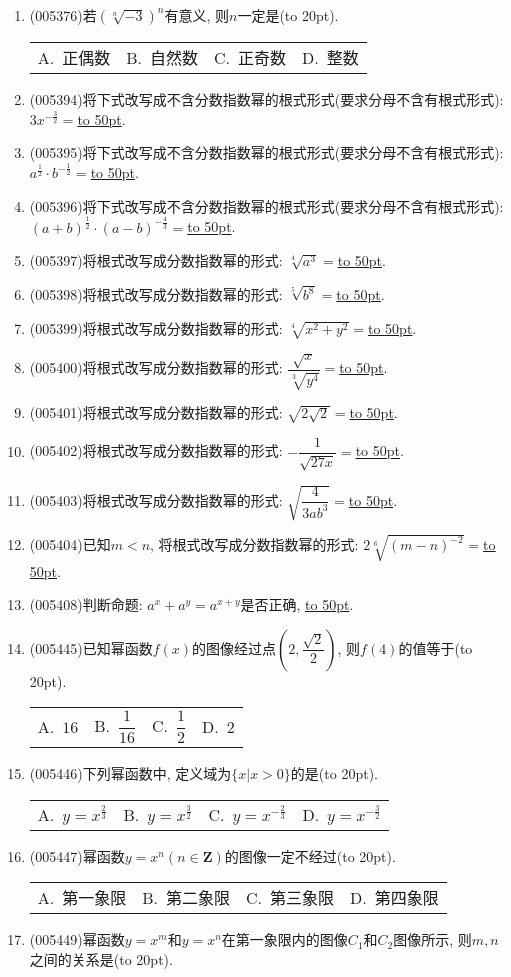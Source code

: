 \documentclass[10pt,a4paper]{article}
\newcommand{\blank}[1]{\underline{\hbox to #1pt{}}}
\newcommand{\bracket}[1]{(\hbox to #1pt{})}
\newcommand{\fourch}[4]{\par\begin{tabular}{p{.23\textwidth}p{.23\textwidth}p{.23\textwidth}p{.23\textwidth}}
A.~#1 &B.~#2& C.~#3& D.~#4
\end{tabular}}
\begin{document}
\begin{enumerate}[1.]
\fourch{$y=(\dfrac{0.9576}{100})^x$}{$y=(0.9576)^{100x}$}{$y=(0.9576)^{\frac x{100}}$}{$y=1-(1-0.9576)^{\frac x{100}}$}
\item {\tiny (005376)}若$(\sqrt [n]{-3})^n$有意义, 则$n$一定是\bracket{20}.
\fourch{正偶数}{自然数}{正奇数}{整数}
\item {\tiny (005394)}将下式改写成不含分数指数幂的根式形式(要求分母不含有根式形式): $3x^{-\frac 32}=$\blank{50}.
\item {\tiny (005395)}将下式改写成不含分数指数幂的根式形式(要求分母不含有根式形式): $a^{\frac 12}\cdot b^{-\frac 12}=$\blank{50}.
\item {\tiny (005396)}将下式改写成不含分数指数幂的根式形式(要求分母不含有根式形式): $(a+b)^{\frac 12}\cdot (a-b)^{-\frac 43}=$\blank{50}.
\item {\tiny (005397)}将根式改写成分数指数幂的形式: $\sqrt [4]{a^3}=$\blank{50}.
\item {\tiny (005398)}将根式改写成分数指数幂的形式: $\sqrt [5]{b^8}=$\blank{50}.
\item {\tiny (005399)}将根式改写成分数指数幂的形式: $\sqrt [4]{x^2+y^2}=$\blank{50}.
\item {\tiny (005400)}将根式改写成分数指数幂的形式: $\dfrac{\sqrt x}{\sqrt [3]{y^4}}=$\blank{50}.
\item {\tiny (005401)}将根式改写成分数指数幂的形式: $\sqrt {2\sqrt 2}=$\blank{50}.
\item {\tiny (005402)}将根式改写成分数指数幂的形式: $-\dfrac 1{\sqrt {27x}}=$\blank{50}.
\item {\tiny (005403)}将根式改写成分数指数幂的形式: $\sqrt {\dfrac 4{3ab^3}}=$\blank{50}.
\item {\tiny (005404)}已知$m<n$, 将根式改写成分数指数幂的形式: $2\sqrt [6]{(m-n)^{-2}}=$\blank{50}.
\item {\tiny (005408)}判断命题: $a^x+a^y=a^{x+y}$是否正确, \blank{50}.
\item {\tiny (005445)}已知幂函数$f(x)$的图像经过点$(2,\dfrac{\sqrt 2}2)$, 则$f(4)$的值等于\bracket{20}.
\fourch{$16$}{$\dfrac 1{16}$}{$\dfrac 12$}{$2$}
\item {\tiny (005446)}下列幂函数中, 定义域为$\{x|x>0\}$的是\bracket{20}.
\fourch{$y=x^{\frac 23}$}{$y=x^{\frac 32}$}{$y=x^{-\frac 23}$}{$y=x^{-\frac 32}$}
\item {\tiny (005447)}幂函数$y=x^n(n\in \mathbf{Z})$的图像一定不经过\bracket{20}.
\fourch{第一象限}{第二象限}{第三象限}{第四象限}
\item {\tiny (005449)}幂函数$y=x^m$和$y=x^n$在第一象限内的图像$C_1$和$C_2$图像所示, 则$m,n$之间的关系是\bracket{20}.

\end{enumerate}
\end{document}
